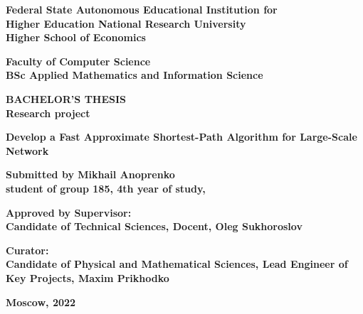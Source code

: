 \thispagestyle{empty}

\begin{center}
\textbf{
\small Federal State Autonomous Educational Institution for\\Higher Education National Research University}\\
\textbf{\small Higher School of Economics}
\end{center}

\begin{center}
\textbf{\small Faculty of Computer Science}\\
\textbf{\small BSc Applied Mathematics and Information Science}
\end{center}

\vspace{2cm}

\begin{center}
\textbf{\Large BACHELOR'S THESIS}\\
\textbf{Research project}

\medskip

\textbf{\Large Develop a Fast Approximate Shortest-Path Algorithm for Large-Scale Network}
\end{center}

\vspace{2cm}

\noindent\textbf{Submitted by Mikhail Anoprenko}\\
\textbf{student of group 185, 4th year of study,}

\vspace{1cm}

\noindent\textbf{Approved by Supervisor:}\\
\textbf{Candidate of Technical Sciences, Docent, Oleg Sukhoroslov}

\vspace{1cm}

\noindent\textbf{Curator:}\\
\textbf{Candidate of Physical and Mathematical Sciences, Lead Engineer of Key Projects, Maxim Prikhodko}

\vspace{4cm}

\begin{center}
\textbf{Moscow, 2022}
\end{center}
